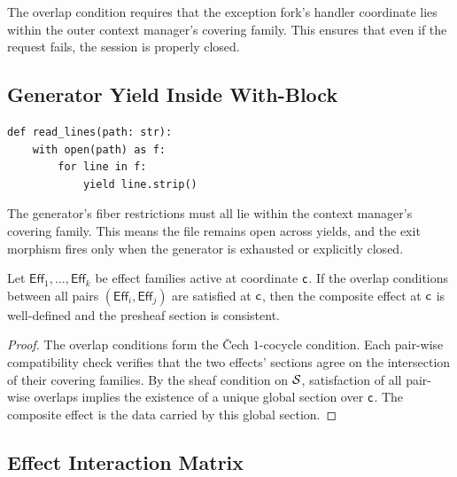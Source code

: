 \documentclass[11pt]{article}
\newcommand{\Eff}{\mathsf{Eff}}          %
\begin{document}
The overlap condition requires that the exception fork's handler
coordinate lies within the outer context manager's covering family.
This ensures that even if the request fails, the session is properly
closed.

\subsection{Generator Yield Inside With-Block}

\begin{lstlisting}[style=jugeo-python,caption={Generator yielding inside context manager.}]
def read_lines(path: str):
    with open(path) as f:
        for line in f:
            yield line.strip()
\end{lstlisting}

The generator's fiber restrictions must all lie within the context
manager's covering family.  This means the file remains open across
yields, and the exit morphism fires only when the generator is
exhausted or explicitly closed.

\begin{theorem}\label{thm:interaction}
Let $\Eff_1, \ldots, \Eff_k$ be effect families active at coordinate
$\mathsf{c}$.  If the overlap conditions between all pairs
$(\Eff_i, \Eff_j)$ are satisfied at $\mathsf{c}$, then the composite
effect at $\mathsf{c}$ is well-defined and the presheaf section is
consistent.
\end{theorem}

\begin{proof}
The overlap conditions form the \v{C}ech $1$-cocycle condition.
Each pair-wise compatibility check verifies that the two effects'
sections agree on the intersection of their covering families.
By the sheaf condition on $\mathcal{S}$, satisfaction of all pair-wise
overlaps implies the existence of a unique global section over
$\mathsf{c}$.  The composite effect is the data carried by this global
section.
\end{proof}

\subsection{Effect Interaction Matrix}
\end{document}
